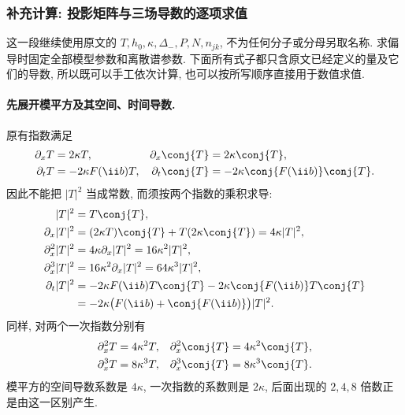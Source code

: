 \subsubsection*{补充计算: 投影矩阵与三场导数的逐项求值}
这一段继续使用原文的 $T,h_0,\kappa,\Delta_-,P,N,n_{jk}$, 不为任何分子或分母另取名称. 求偏导时固定全部模型参数和离散谱参数. 下面所有式子都只含原文已经定义的量及它们的导数, 所以既可以手工依次计算, 也可以按所写顺序直接用于数值求值.

\paragraph{先展开模平方及其空间、时间导数.}
原有指数满足
\begin{align*}
\partial_xT&=2\kappa T,
&\partial_x\conj{T}&=2\kappa\conj{T},\\
\partial_tT&=-2\kappa F(\ii b)T,
&\partial_t\conj{T}&=-2\kappa\conj{F(\ii b)}\conj{T}.
\end{align*}
因此不能把 $|T|^2$ 当成常数, 而须按两个指数的乘积求导:
\begin{align*}
|T|^2&=T\conj{T},\\
\partial_x|T|^2
&=(2\kappa T)\conj{T}
+T(2\kappa\conj{T})=4\kappa|T|^2,\\
\partial_x^2|T|^2
&=4\kappa\partial_x|T|^2
=16\kappa^2|T|^2,\\
\partial_x^3|T|^2
&=16\kappa^2\partial_x|T|^2
=64\kappa^3|T|^2,\\
\partial_t|T|^2
&=-2\kappa F(\ii b)T\conj{T}
-2\kappa\conj{F(\ii b)}T\conj{T}\\
&=-2\kappa\bigl(F(\ii b)+\conj{F(\ii b)}\bigr)|T|^2.
\end{align*}
同样, 对两个一次指数分别有
\begin{align*}
\partial_x^2T&=4\kappa^2T,
&\partial_x^2\conj{T}&=4\kappa^2\conj{T},\\
\partial_x^3T&=8\kappa^3T,
&\partial_x^3\conj{T}&=8\kappa^3\conj{T}.
\end{align*}
模平方的空间导数系数是 $4\kappa$, 一次指数的系数则是 $2\kappa$, 后面出现的 $2,4,8$ 倍数正是由这一区别产生.

